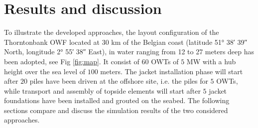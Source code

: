 \section{Results and discussion}
\label{results}
To illustrate the developed approaches, the layout configuration of the Thorntonbank OWF located at 30 km of the Belgian coast (latitude 51° 38′ 39″ North, longitude 2° 55′ 38″ East), in water ranging from 12 to 27 meters deep has been adopted, see Fig \ref{fig:map}.
It consist of $60$ OWTs of $5$ MW with a hub height over the sea level of $100$ meters.
The jacket installation phase will start after $20$ piles have been driven at the offshore site, i.e. the piles for $5$ OWTs, while transport and assembly of topside elements will start after $5$ jacket foundations have been installed and grouted on the seabed.
The following sections compare and discuss the simulation results of the two considered approaches.